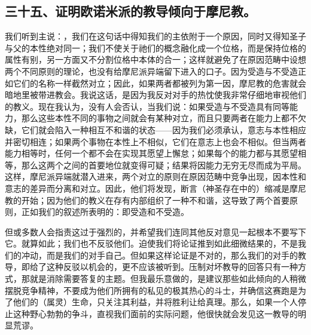 
\subsection{三十五、证明欧诺米派的教导倾向于摩尼教。}

我们听到主说：，我们在这句话中得知我们的主依附于一个原因，同时又得知圣子与父的本性绝对同一；我们不使关于祂们的概念融化成一个位格，而是保持位格的属性有别，另一方面又不分割位格中本体的合一；这样就避免了在原因范畴中设想两个不同原则的理论，也没有给摩尼派异端留下进入的口子。因为受造与不受造正如它们的名称一样截然对立；因此，如果两者都被列为第一因，摩尼教的危害就会暗地里被带进教会。我说这话，是因为我反对对手的热忱使我非常仔细地审视他们的教义。现在我认为，没有人会否认，当我们说：如果受造与不受造具有同等能力，那么这些本性不同的事物之间就会有某种对立，而且只要两者在能力上都不欠缺，它们就会陷入一种相互不和谐的状态——因为我们必须承认，意志与本性相应并密切相连；如果两个事物在本性上不相似，它们在意志上也会不相似。但当两者能力相等时，任何一个都不会在实现其愿望上懈怠；如果每个的能力都与其愿望相等，那么这两个之间的首要地位就变得可疑；结果将因能力无穷无尽而成为平局。这样，摩尼派异端就潜入进来，两个对立的原则在原因范畴中竞争出现，因本性和意志的差异而分离和对立。因此，他们将发现，断言（神圣存在中的）缩减是摩尼教的开始；因为他们的教义在存有内部组织了一种不和谐，这导致了两个首要原则，正如我们的叙述所表明的：即受造和不受造。\par

但或多数人会指责这过于强烈的，并希望我们连同其他反对意见一起根本不要写下它。就算如此；我们也不反驳他们。迫使我们将论证推到如此细微结果的，不是我们的冲动，而是我们的对手自己。但如果这样论证是不对的，那么我们的对手的教导，即给了这种反驳以机会的，更不应该被听到。压制对坏教导的回答只有一种方式，那就是消除需要答复的主题。但我最乐意做的，是建议那些如此倾向的人稍微摆脱竞争精神，不要成为他们所拥有的私见的极其热心的斗士，并确信这赛跑是为了他们的（属灵）生命，只关注其利益，并将胜利让给真理。那么，如果一个人停止这种野心勃勃的争斗，直视我们面前的实际问题，他很快就会发见这一教导的明显荒谬。\par

